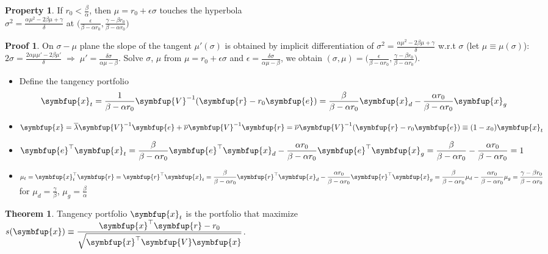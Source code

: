 \documentclass[11pt]{extarticle}
\newcommand{\ds}{\displaystyle}
\newcommand{\ie}{\;\Longrightarrow\;}
\newcommand{\vx}{\symbfup{x}}
\newcommand{\vV}{\symbfup{V}}
\newcommand{\ve}{\symbfup{e}}
\newcommand{\vr}{\symbfup{r}}
\theoremstyle{definition}
\newtheorem*{prp}{Property}
\newtheorem*{thm}{Theorem}
\newtheorem*{prf}{Proof}
\begin{document}
\begin{prp}
  If $\ds r_0 < \frac{\beta}{\alpha}$, then $\mu = r_0 + \epsilon\sigma$ touches the hyperbola \\$\ds\sigma^2 = \frac{\alpha\mu^2 - 2\beta\mu + \gamma}{\delta}$ at $\ds\Big(\frac{\epsilon}{\beta - \alpha r_0}, \frac{\gamma - \beta r_0}{\beta - \alpha r_0}\Big)$
\end{prp}

\begin{prf}
  On $\sigma-\mu$ plane the slope of the tangent $\mu'(\sigma)$ is obtained by implicit differentiation of $\ds\sigma^2 = \frac{\alpha\mu^2 - 2\beta\mu + \gamma}{\delta}$ w.r.t $\sigma$ (let $\ds\mu\equiv\mu(\sigma)$): \\$\ds 2\sigma = \frac{2\alpha\mu\mu' - 2\beta\mu'}{\delta}\ie \mu' = \frac{\delta\sigma}{\alpha\mu - \beta}$. Solve $\sigma$, $\mu$ from $\ds\mu = r_0 + \epsilon\sigma$ and $\ds\epsilon = \frac{\delta\sigma}{\alpha\mu - \beta}$, we obtain $\ds(\sigma,\mu) = \Big(\frac{\epsilon}{\beta - \alpha r_0}, \frac{\gamma - \beta r_0}{\beta - \alpha r_0}\Big)$.
\end{prf}

\begin{itemize}\setlength\itemsep{0em}
  \item Define the tangency portfolio 
    \begin{align*}
      \ds\vx_t = \frac{1}{\beta-\alpha r_0}\vV^{-1}(\vr - r_0\ve) = \frac{\beta}{\beta - \alpha r_0}\vx_d - \frac{\alpha r_0}{\beta - \alpha r_0}\vx_g
    \end{align*}
  \item $\ds\vx = \overline{\lambda}\vV^{-1}\ve + \overline{\nu}\vV^{-1}\vr = \overline{\nu}\vV^{-1}(\vr - r_0\ve)\equiv(1 - x_0)\vx_t$
  \item $\ds\ve^\top\vx_t = \frac{\beta}{\beta - \alpha r_0}\ve^\top\vx_d - \frac{\alpha r_0}{\beta - \alpha r_0}\ve^\top\vx_g = \frac{\beta}{\beta - \alpha r_0} - \frac{\alpha r_0}{\beta - \alpha r_0} = 1$
  \item $\ds\mu_t = \vx^\top_t\vr = \vr^\top\vx_t = \frac{\beta}{\beta - \alpha r_0}\vr^\top\vx_d - \frac{\alpha r_0}{\beta - \alpha r_0}\vr^\top\vx_g \\ = \frac{\beta}{\beta - \alpha r_0}\mu_d - \frac{\alpha r_0}{\beta - \alpha r_0}\mu_g = \frac{\gamma - \beta r_0}{\beta - \alpha r_0}$ for $\ds\mu_d = \frac{\gamma}{\beta}$, $\ds\mu_g = \frac{\beta}{\alpha}$
\end{itemize}

\begin{thm}
  Tangency portfolio $\vx_t$ is the portfolio that maximize \\$\ds s(\vx)\equiv\frac{\vx^\top\vr - r_0}{\sqrt{\vx^\top\vV\vx}}$.
\end{thm}
\end{document}
